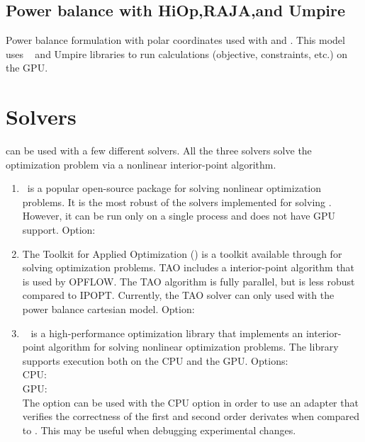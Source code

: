 \subsection{Power balance with HiOp,RAJA,and Umpire}
Power balance formulation with polar coordinates used with \hiop and \raja. This model uses \raja~\cite{beckingsale2019raja} and Umpire \cite{beckingsale2019umpire} libraries to run \opflow calculations (objective, constraints, etc.) on the GPU. 

\section{Solvers}\label{sec:opflow_solvers}
\opflow can be used with a few different solvers. All the three solvers solve the optimization problem via a nonlinear interior-point algorithm.
\begin{enumerate}
  \item \ipopt~is a popular open-source package for solving nonlinear optimization problems. It is the most robust of the solvers implemented for solving \opflow. However, it can be run only on a single process and does not have GPU support. Option: \\
  \item The Toolkit for Applied Optimization (\tao) is a toolkit available through \petsc for solving optimization problems. TAO includes a interior-point algorithm that is used by OPFLOW. The TAO algorithm is fully parallel, but is less robust compared to IPOPT. Currently, the TAO solver can only used with the power balance cartesian model. Option:\\  
  \item \hiop~ is a high-performance optimization library that implements an interior-point algorithm for solving nonlinear optimization problems. The library supports execution both on the CPU and the GPU. Options: \\ CPU:   \\ GPU:   \\ The option  can be used with the CPU option in order to use an adapter that verifies the correctness of the first and second order derivates when compared to \ipopt. This may be useful when debugging experimental changes.
\end{enumerate}

